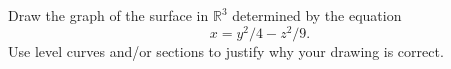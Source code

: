 \begin{problem}
Draw the graph of the surface in $\mathbb{R}^3$ determined by the equation
\[
x = y^2/4 - z^2/9.
\]
Use level curves and/or sections to justify why your drawing is correct.
\end{problem}